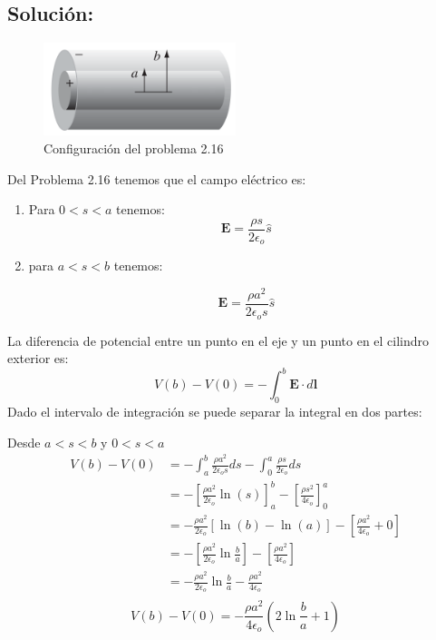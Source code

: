\documentclass[12pt]{article}
\begin{document}
\subsection*{Solución:}

\begin{figure}[H]
    \centering
    \includegraphics[width=0.5\textwidth]{imagenes/problema_24.png}
    \caption{\label{fig:problema_24}Configuración del problema 2.16}
\end{figure}


Del Problema 2.16 tenemos que el campo eléctrico es:
\begin{enumerate}[label=(\roman*)]
    \item Para \(0 < s < a\) tenemos:
        \[
        \mathbf{E} = \frac{\rho s}{2\epsilon_o }  \hat{s}
        \]
    \item  para \( a < s < b \) tenemos:
            
        \[
        \mathbf{E} = \frac{\rho a^2}{2\epsilon_o s }  \hat{s}
        \]
\end{enumerate} 

La diferencia de potencial entre un punto en el eje y un punto en el cilindro exterior es:
\[
{V(b)}-{V(0)}   = -\int_{0}^{b} \mathbf{E}\cdot d \mathbf{l}  
\]
Dado el intervalo de integración se puede separar la integral en dos partes:

Desde  \(a < s < b\) y  \(0 < s <a\)
\begin{align*}
    {V(b)}-{V(0)}   &= -\int_{a}^{b} \frac{\rho a^2}{2\epsilon_o s } ds - \int_{0}^{a} \frac{\rho s}{2\epsilon_o } ds \\
    &= -\left[\frac{\rho a^2}{2\epsilon_o} \ln(s) \right]_{a}^{b} - \left[\frac{\rho s^2}{4\epsilon_o} \right]_{0}^{a} \\
    &= -\frac{\rho a^2}{2\epsilon_o} \left[\ln(b) -\ln(a)  \right] - \left[\frac{\rho a^2}{4\epsilon_o} + 0 \right] \\
    &= -\left[\frac{\rho a^2}{2\epsilon_o} \ln{\frac{b}{a} } \right] - \left[\frac{\rho a^2}{4\epsilon_o} \right] \\
    &= -\frac{\rho a^2}{2\epsilon_o} \ln{\frac{b}{a} } - \frac{\rho a^2}{4\epsilon_o}\\
\end{align*}
\[
\boxed{V(b)-V(0) =-\frac{\rho a^2}{4\epsilon_o} \left(2\ln{\frac{b}{a} } + 1 \right) }
\]
\end{document}
